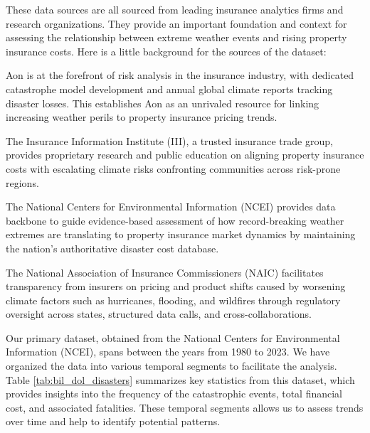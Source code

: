 \documentclass[12pt]{article}
\begin{document}
These data sources are all sourced from leading insurance analytics firms and research organizations. They provide an important foundation and 
context for assessing the relationship between extreme weather events and rising property insurance costs. Here is a little background
for the sources of the dataset:

Aon is at the forefront of risk analysis in the insurance industry, with dedicated catastrophe model development and annual global 
climate reports tracking disaster losses. This establishes Aon as an unrivaled resource for linking increasing weather perils to 
property insurance pricing trends.

The Insurance Information Institute (III), a trusted insurance trade group, provides proprietary research and public education on aligning 
property insurance costs with escalating climate risks confronting communities across risk-prone regions.

The National Centers for Environmental Information (NCEI) provides data backbone to guide evidence-based assessment of how record-breaking 
weather extremes are translating to property insurance market dynamics by maintaining the nation's authoritative disaster cost 
database.

The National Association of Insurance Commissioners (NAIC) facilitates transparency from insurers on pricing and product shifts caused by 
worsening climate factors such as hurricanes, flooding, and wildfires through regulatory oversight across states, structured data 
calls, and cross-collaborations.

Our primary dataset, obtained from the National Centers for Environmental Information (NCEI)\cite{ncei}, spans between the years from 
1980 to 2023. We have organized the data into various temporal segments to facilitate the analysis. Table \ref{tab:bil_dol_disasters} 
summarizes key statistics from this dataset, which provides insights into the frequency of the catastrophic events, total financial cost, and 
associated fatalities. These temporal segments allows us to assess trends over time and help to identify potential patterns.
\end{document}
